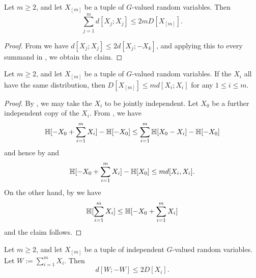 \begin{lemma}\label{multidist-ruzsa-II}\leanok
  Let $m \ge 2$, and let $X_{[m]}$ be a tuple of $G$-valued random variables. Then
  $$\sum_{j=1}^m d[X_j;X_j] \leq 2 m D[X_{[m]}].$$
\end{lemma}

\begin{proof}\leanok
From  we have $d[X_j;X_j] \leq 2 d[X_j;-X_k]$, and applying this to every summand in , we obtain the claim.
\end{proof}

\begin{lemma}\label{multidist-ruzsa-III}\leanok
  Let $m \ge 2$, and let $X_{[m]}$ be a tuple of $G$-valued random variables. If the $X_i$ all have the same distribution, then $D[X_{[m]}] \leq m d[X_i;X_i]$ for any $1 \leq i \leq m$.
\end{lemma}

\begin{proof}\leanok
  By ,  we may take the $X_i$ to be jointly independent.    Let $X_0$ be a further independent copy of the $X_i$.
From , we have
$$ \mathbb{H}[-X_0 + \sum_{i=1}^m X_i] - \mathbb{H}[-X_0] \leq \sum_{i=1}^m \mathbb{H}[X_0 - X_i] - \mathbb{H}[-X_0]$$
and hence by  and 
$$ \mathbb{H}[-X_0 + \sum_{i=1}^m X_i] - \mathbb{H}[X_0] \leq m d[X_i,X_i].$$
On the other hand, by  we have
$$ \mathbb{H}[\sum_{i=1}^m X_i] \leq \mathbb{H}[-X_0 + \sum_{i=1}^m X_i]$$
and the claim follows.
\end{proof}

\begin{lemma}\label{multidist-ruzsa-IV}\leanok
  Let $m \ge 2$, and let $X_{[m]}$ be a tuple of independent $G$-valued random variables.  Let $W := \sum_{i=1}^m X_i$. Then
  $$ d[W;-W] \leq 2 D[X_i].$$
\end{lemma}

